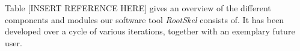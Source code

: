 %


Table [INSERT REFERENCE HERE] gives an overview of the different components and modules our software tool \textit{RootSkel} consists of. It has been developed over a cycle of various iterations, together with an exemplary future user. 






